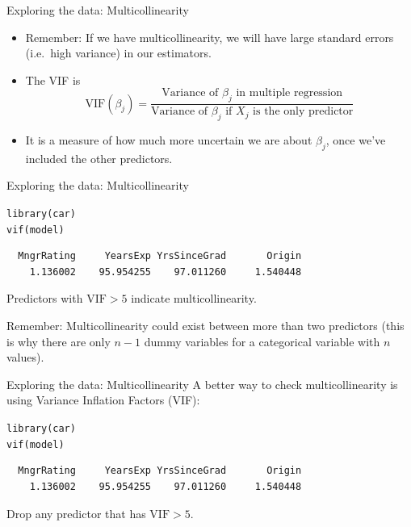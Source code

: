 \documentclass{beamer}\usepackage[]{graphicx}\usepackage[]{color}
\makeatletter
\newcommand{\hlstd}[1]{\textcolor[rgb]{1,0.894,0.769}{#1}}%
\newcommand{\hlkwd}[1]{\textcolor[rgb]{1,0.78,0.769}{#1}}%
\newenvironment{kframe}{%
 \def\at@end@of@kframe{}%
 \ifinner\ifhmode%
  \def\at@end@of@kframe{\end{minipage}}%
  \begin{minipage}{\columnwidth}%
 \fi\fi%
 \def\FrameCommand##1{\hskip\@totalleftmargin \hskip-\fboxsep
 \colorbox{shadecolor}{##1}\hskip-\fboxsep
     \hskip-\linewidth \hskip-\@totalleftmargin \hskip\columnwidth}%
 \MakeFramed {\advance\hsize-\width
   \@totalleftmargin\z@ \linewidth\hsize
   \@setminipage}}%
 {\par\unskip\endMakeFramed%
 \at@end@of@kframe}
\newenvironment{knitrout}{}{} %
\makeatother
\begin{document}
\begin{darkframes}
\begin{frame}[fragile]{Exploring the data: Multicollinearity}
      \begin{itemize}
      \item Remember: If we have multicollinearity, we will have large standard errors (i.e.\ high variance) in our estimators.
      \item The VIF is 
      $$\mbox{VIF}(\beta_j) = \frac{\mbox{Variance of $\beta_j$ in multiple regression}}{\mbox{Variance of $\beta_j$ if $X_j$ is the only predictor}}$$
      \item It is a measure of how much more uncertain we are about $\beta_j$, once we've included the other predictors.
      \end{itemize}
\end{frame}
\begin{frame}[fragile]{Exploring the data: Multicollinearity}      
\begin{knitrout}
\begin{kframe}
\begin{alltt}
\hlkwd{library}\hlstd{(car)}
\hlkwd{vif}\hlstd{(model)}
\end{alltt}
\begin{verbatim}
  MngrRating     YearsExp YrsSinceGrad       Origin 
    1.136002    95.954255    97.011260     1.540448 
\end{verbatim}
\end{kframe}
\end{knitrout}
      Predictors with $\text{VIF} > 5$ indicate multicollinearity.
      \pause  \bigskip
      
      \alert{Remember:} Multicollinearity could exist between more than two predictors (this is why there are only $n-1$ dummy variables for a categorical variable with $n$ values).  
\end{frame}
    
\begin{frame}[fragile]{Exploring the data: Multicollinearity}      
      A better way to check multicollinearity is using Variance Inflation Factors (VIF):
\begin{knitrout}
\begin{kframe}
\begin{alltt}
\hlkwd{library}\hlstd{(car)}
\hlkwd{vif}\hlstd{(model)}
\end{alltt}
\begin{verbatim}
  MngrRating     YearsExp YrsSinceGrad       Origin 
    1.136002    95.954255    97.011260     1.540448 
\end{verbatim}
\end{kframe}
\end{knitrout}
      Drop any predictor that has $\text{VIF} > 5$.
      \pause  \bigskip
      

\end{frame}
\end{darkframes}
\end{document}
